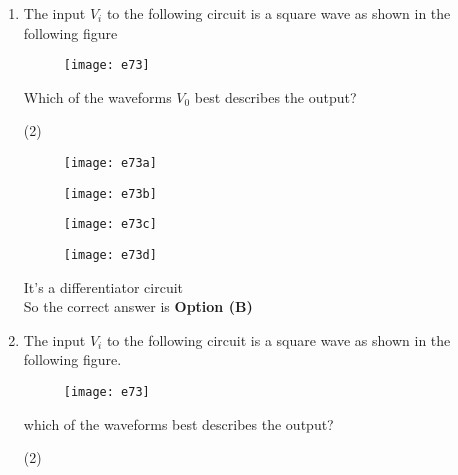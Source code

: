 \begin{enumerate}
\begin{answer}
	\begin{align*}
	v&=A_{1} \sin \omega t . A_{2} \cos \omega t=\frac{A_{1} A_{2}}{2}[\sin (\omega t+\omega t)+\sin (\omega t-\omega t)]\\
	v&=\frac{A_{1} A_{2}}{2} \sin 2 \omega t
	\intertext{This signal will be filtered out, so output is $0 V$.}
	\end{align*}
	So the correct answer is \textbf{Option (D)}
\end{answer}
	\item The input $V_i$ to the following circuit is a square wave as shown in the following figure\\
	\begin{figure}[H]
		\centering
		\texttt{[image: e73]}
	\end{figure}
	Which of the waveforms $V_0$ best describes the output?
	{	}
	\begin{tasks}(2)
		\task[\textbf{A.}] \begin{figure}[H]
			\centering
			\texttt{[image: e73a]}
		\end{figure}
		\task[\textbf{B.}] \begin{figure}[H]
			\centering
			\texttt{[image: e73b]}
		\end{figure}
		\task[\textbf{C.}] \begin{figure}[H]
			\centering
			\texttt{[image: e73c]}
		\end{figure}
		\task[\textbf{D.}] \begin{figure}[H]
			\centering
			\texttt{[image: e73d]}
		\end{figure}
	\end{tasks}
\begin{answer}$\left. \right. $\\
	It’s a differentiator circuit\\
	So the correct answer is \textbf{Option (B)}
\end{answer}
	\item The input $V_ i$ to the following circuit is a square wave as shown in the following figure.\\
	\begin{figure}[H]
		\centering
		\texttt{[image: e73]}
	\end{figure}
	which of the waveforms best describes the output?
	{	}
	\begin{tasks}(2)

\end{tasks}
\end{enumerate}
